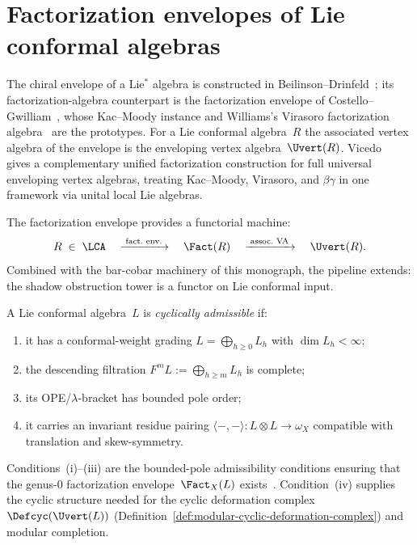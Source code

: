 \section{Factorization envelopes of Lie conformal algebras}
\label{sec:concordance-nishinaka-vicedo}

The chiral envelope of a Lie$^*$ algebra is constructed in
Beilinson--Drinfeld~\cite[\S3.7]{BD04}; its factorization-algebra
counterpart is the factorization envelope of
Costello--Gwilliam~\cite{CG17}, whose Kac--Moody instance and
Williams's Virasoro factorization algebra~\cite{Williams17Virasoro}
are the prototypes. For a Lie conformal algebra~$R$ the associated
vertex algebra of the envelope is the enveloping vertex
algebra~$\Uvert(R)$. Vicedo~\cite{Vic25}
gives a complementary unified factorization construction for
full universal enveloping vertex algebras, treating Kac--Moody,
Virasoro, and $\beta\gamma$ in one framework via unital
local Lie algebras.

The factorization envelope provides a functorial machine:
\begin{equation}\label{eq:factorization-envelope-pipeline}
R \;\in\; \LCA
\quad\xrightarrow{\;\text{fact.\ env.}\;}\quad
\Fact(R)
\quad\xrightarrow{\;\text{assoc.\ VA}\;}\quad
\Uvert(R).
\end{equation}
Combined with the bar-cobar machinery of this monograph,
the pipeline extends: the shadow obstruction tower is a functor
on Lie conformal input.

\begin{definition}
\label{def:v1-cyclically-admissible-concordance}
A Lie conformal algebra~$L$ is \emph{cyclically admissible} if:
\begin{enumerate}[label=\textup{(\roman*)}]
\item it has a conformal-weight grading
 $L = \bigoplus_{h \geq 0} L_h$ with $\dim L_h < \infty$;
\item the descending filtration
 $F^m L := \bigoplus_{h \geq m} L_h$ is complete;
\item its OPE/$\lambda$-bracket has bounded pole order;
\item it carries an invariant residue pairing
 $\langle{-},{-}\rangle \colon L \otimes L \to \omega_X$
 compatible with translation and skew-symmetry.
\end{enumerate}
Conditions~(i)--(iii) are the bounded-pole admissibility
conditions ensuring that the genus-$0$ factorization
envelope~$\Fact_X(L)$ exists~\cite[\S3.7]{BD04}.
Condition~(iv) supplies the cyclic structure needed for the
cyclic deformation complex
$\Defcyc(\Uvert(L))$
(Definition~\ref{def:modular-cyclic-deformation-complex})
and modular completion.
\end{definition}

